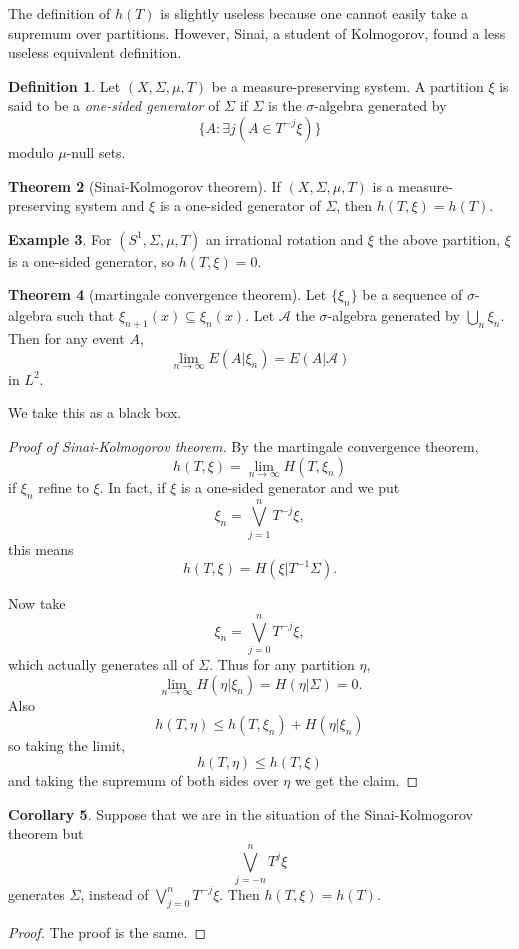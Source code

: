 \documentclass[12pt]{report}
\newcommand{\dfn}[1]{\emph{#1}\index{#1}}
\theoremstyle{definition}
\newtheorem{theorem}{Theorem}[chapter]
\newtheorem{corollary}[theorem]{Corollary}
\newtheorem{definition}[theorem]{Definition}
\newtheorem{example}[theorem]{Example}
\begin{document}
The definition of $h(T)$ is slightly useless because one cannot easily take a supremum over partitions. However, Sinai, a student of Kolmogorov, found a less useless equivalent definition.
\begin{definition}
Let $(X, \Sigma, \mu, T)$ be a measure-preserving system. A partition $\xi$ is said to be a \dfn{one-sided generator} of $\Sigma$ if $\Sigma$ is the $\sigma$-algebra generated by
$$\{A: \exists j(A \in T^{-j}\xi)\}$$
modulo $\mu$-null sets.
\end{definition}

\begin{theorem}[Sinai-Kolmogorov theorem]
If $(X, \Sigma, \mu, T)$ is a measure-preserving system and $\xi$ is a one-sided generator of $\Sigma$, then $h(T, \xi) = h(T)$.
\end{theorem}

\begin{example}
For $(S^1, \Sigma, \mu, T)$ an irrational rotation and $\xi$ the above partition, $\xi$ is a one-sided generator, so $h(T, \xi) = 0$.
\end{example}

\begin{theorem}[martingale convergence theorem]
Let $\{\xi_n\}$ be a sequence of $\sigma$-algebra such that $\xi_{n+1}(x) \subseteq \xi_n(x)$.
Let $\mathcal A$ the $\sigma$-algebra generated by $\bigcup_n \xi_n$. Then for any event $A$,
$$\lim_{n \to \infty} E(A|\xi_n) = E(A|\mathcal A)$$
in $L^2$.
\end{theorem}
We take this as a black box.

\begin{proof}[Proof of Sinai-Kolmogorov theorem]
By the martingale convergence theorem,
$$h(T, \xi) = \lim_{n \to \infty} H(T, \xi_n)$$
if $\xi_n$ refine to $\xi$.
In fact, if $\xi$ is a one-sided generator and we put
$$\xi_n = \bigvee_{j=1}^n T^{-j}\xi,$$
this means
$$h(T, \xi) = H(\xi|T^{-1}\Sigma).$$

Now take
$$\xi_n = \bigvee_{j=0}^n T^{-j}\xi,$$
which actually generates all of $\Sigma$.
Thus for any partition $\eta$,
$$\lim_{n \to \infty} H(\eta|\xi_n) = H(\eta|\Sigma) = 0.$$
Also
$$h(T, \eta) \leq h(T, \xi_n) + H(\eta|\xi_n)$$
so taking the limit,
$$h(T, \eta) \leq h(T, \xi)$$
and taking the supremum of both sides over $\eta$ we get the claim.
\end{proof}

\begin{corollary}
Suppose that we are in the situation of the Sinai-Kolmogorov theorem but
$$\bigvee_{j=-n}^n T^j\xi$$
generates $\Sigma$, instead of $\bigvee_{j=0}^n T^{-j}\xi$. Then $h(T, \xi) = h(T)$.
\end{corollary}
\begin{proof}
The proof is the same.
\end{proof}
\end{document}

